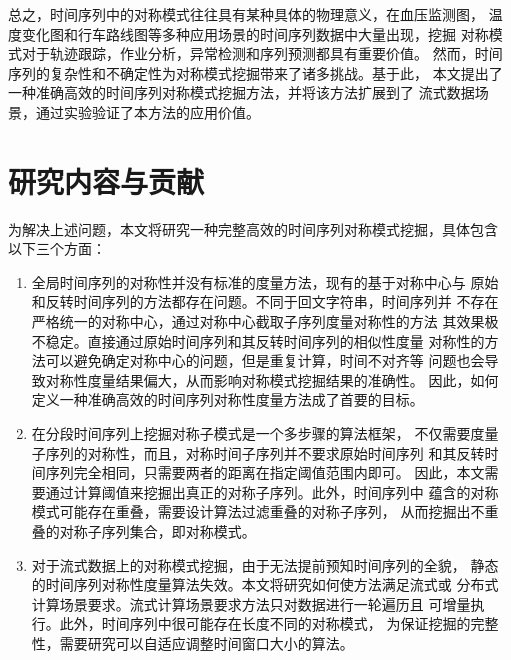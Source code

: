 总之，时间序列中的对称模式往往具有某种具体的物理意义，在血压监测图，
温度变化图和行车路线图等多种应用场景的时间序列数据中大量出现，挖掘
对称模式对于轨迹跟踪，作业分析，异常检测和序列预测都具有重要价值。
然而，时间序列的复杂性和不确定性为对称模式挖掘带来了诸多挑战。基于此，
本文提出了一种准确高效的时间序列对称模式挖掘方法，并将该方法扩展到了
流式数据场景，通过实验验证了本方法的应用价值。


\section{研究内容与贡献}
为解决上述问题，本文将研究一种完整高效的时间序列对称模式挖掘，具体包含
以下三个方面：
\begin{enumerate}
  \item 全局时间序列的对称性并没有标准的度量方法，现有的基于对称中心与
  原始和反转时间序列的方法都存在问题。不同于回文字符串，时间序列并
  不存在严格统一的对称中心，通过对称中心截取子序列度量对称性的方法
  其效果极不稳定。直接通过原始时间序列和其反转时间序列的相似性度量
  对称性的方法可以避免确定对称中心的问题，但是重复计算，时间不对齐等
  问题也会导致对称性度量结果偏大，从而影响对称模式挖掘结果的准确性。
  因此，如何定义一种准确高效的时间序列对称性度量方法成了首要的目标。
  \item 在分段时间序列上挖掘对称子模式是一个多步骤的算法框架，
  不仅需要度量子序列的对称性，而且，对称时间子序列并不要求原始时间序列
  和其反转时间序列完全相同，只需要两者的距离在指定阈值范围内即可。
  因此，本文需要通过计算阈值来挖掘出真正的对称子序列。此外，时间序列中
  蕴含的对称模式可能存在重叠，需要设计算法过滤重叠的对称子序列，
  从而挖掘出不重叠的对称子序列集合，即对称模式。
  \item 对于流式数据上的对称模式挖掘，由于无法提前预知时间序列的全貌，
  静态的时间序列对称性度量算法失效。本文将研究如何使方法满足流式或
  分布式计算场景要求。流式计算场景要求方法只对数据进行一轮遍历且
  可增量执行。此外，时间序列中很可能存在长度不同的对称模式，
  为保证挖掘的完整性，需要研究可以自适应调整时间窗口大小的算法。
\end{enumerate}

